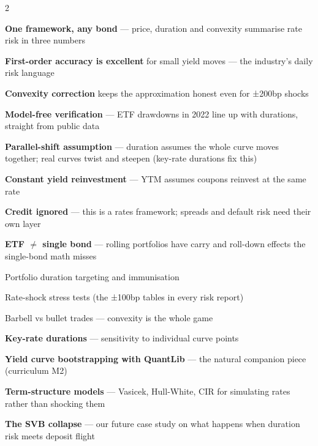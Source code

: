 \documentclass{pyportfolios-note}
\begin{document}
\begin{multicols}{2}
\begin{notebullets}
\item \textbf{One framework, any bond} — price, duration and convexity summarise
      rate risk in three numbers
\item \textbf{First-order accuracy is excellent} for small yield moves — the
      industry's daily risk language
\item \textbf{Convexity correction} keeps the approximation honest even for
      ±200bp shocks
\item \textbf{Model-free verification} — ETF drawdowns in 2022 line up with
      durations, straight from public data
\end{notebullets}

\begin{notebullets}
\item \textbf{Parallel-shift assumption} — duration assumes the whole curve moves
      together; real curves twist and steepen (key-rate durations fix this)
\item \textbf{Constant yield reinvestment} — YTM assumes coupons reinvest at the
      same rate
\item \textbf{Credit ignored} — this is a rates framework; spreads and default
      risk need their own layer
\item \textbf{ETF $\neq$ single bond} — rolling portfolios have carry and
      roll-down effects the single-bond math misses
\end{notebullets}

\begin{notebullets}
\item Portfolio duration targeting and immunisation
\item Rate-shock stress tests (the ±100bp tables in every risk report)
\item Barbell vs bullet trades — convexity is the whole game
\end{notebullets}

\begin{notebullets}
\item \textbf{Key-rate durations} — sensitivity to individual curve points
\item \textbf{Yield curve bootstrapping with QuantLib} — the natural companion
      piece (curriculum M2)
\item \textbf{Term-structure models} — Vasicek, Hull-White, CIR for simulating
      rates rather than shocking them
\item \textbf{The SVB collapse} — our future case study on what happens when
      duration risk meets deposit flight
\end{notebullets}
\end{multicols}
\end{document}
